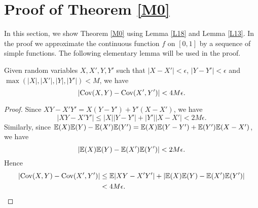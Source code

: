 \section{Proof of Theorem \ref{M0}}
In this section, we show Theorem \ref{M0} using Lemma \ref{L18} and Lemma \ref{L13}. In the proof we approximate the continuous function $f$ on $[0, 1]$ by a sequence of simple functions. The following elementary lemma will be used in the proof.

\begin{lemma}\label{LM0}
Given random variables $X, X', Y, Y'$ such that $|X - X'| < \epsilon$, $|Y - Y'| < \epsilon$ and $\max(|X|, |X'|, |Y|, |Y'|) < M$, we have
\[
|\text{Cov}(X, Y) - \text{Cov}(X', Y')| < 4M \epsilon.
\]
\end{lemma}

\begin{proof}
Since $XY - X'Y' = X(Y - Y') + Y'(X - X')$, we have
\begin{equation}\label{eq:LM01}
|XY - X'Y'| \le |X||Y-Y'| + |Y'||X - X'| < 2M \epsilon.
\end{equation}
Similarly, since $\mathbb{E}(X) \mathbb{E}(Y) - \mathbb{E}(X')\mathbb{E}(Y') = \mathbb{E}(X)\mathbb{E}(Y - Y') + \mathbb{E}(Y')\mathbb{E}(X - X')$, we have
\begin{equation}\label{eq:LM02}
|\mathbb{E}(X) \mathbb{E}(Y) - \mathbb{E}(X')\mathbb{E}(Y') | < 2M \epsilon.
\end{equation}
Hence
\begin{align*}
|\text{Cov}(X, Y) - \text{Cov}(X', Y')| &\le \mathbb{E}|XY - X'Y'| + |\mathbb{E}(X) \mathbb{E}(Y) - \mathbb{E}(X')\mathbb{E}(Y')| \\
                            &< 4M \epsilon.
\end{align*}
\end{proof}

